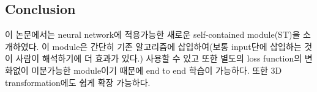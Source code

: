 \documentclass[extendedabs]{bmvc2k}
\begin{document}
\subsection{Conclusion}
 이 논문에서는 neural network에 적용가능한 새로운 self-contained module(ST)을 소개하였다. 이 module은 간단히 기존 알고리즘에 삽입하여(보통 input단에 삽입하는 것이 사람이 해석하기에 더 효과가 있다.) 
 사용할 수 있고 또한 별도의 loss function의 변화없이 미분가능한 module이기 때문에 end to end 학습이 가능하다. 또한 3D transformation에도 쉽게 확장 가능하다.
\newpage

\end{document}

